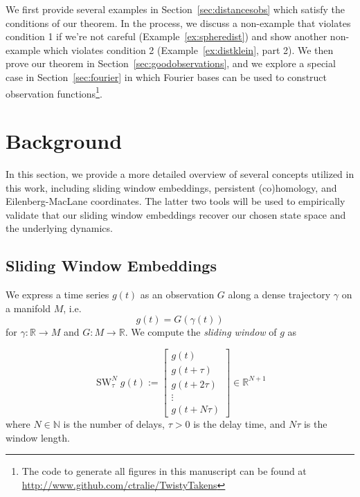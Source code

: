 \documentclass[11pt]{article}
\newcommand{\ChrisEdit}[1]{\textcolor{red}{(#1)}}
\theoremstyle{definition}
\theoremstyle{remark}
\newcommand{\RR}{\mathbb{R}}
\newcommand{\NN}{\mathbb{N}}
\DeclareMathOperator{\SW}{SW}
\begin{document}
    
    We first provide several examples in Section~\ref{sec:distancesobs} which satisfy the conditions of our theorem.  In the process, we discuss a non-example that violates condition 1 if we're not careful (Example~\ref{ex:spheredist}) and show another non-example which violates condition 2 (Example~\ref{ex:distklein}, part 2).  We then prove our theorem in Section~\ref{sec:goodobservations}, and we explore a special case in Section~\ref{sec:fourier} in which Fourier bases can be used to construct observation functions\footnote{The code to generate all figures in this manuscript can be found at \url{http://www.github.com/ctralie/TwistyTakens}}.



    \section{Background}


    In this section, we provide a more detailed overview of several  concepts utilized in this work, including sliding window embeddings, persistent (co)homology, and Eilenberg-MacLane coordinates.  The latter two tools will be used to empirically validate that our sliding window embeddings recover our chosen state space
     and the underlying dynamics.




    \subsection{Sliding Window Embeddings}

    We express a time series $g(t)$ as an observation $G$ along a dense trajectory $\gamma$ on a manifold $M$, i.e.
    \[g(t) = G(\gamma(t))\]
    for $\gamma : \RR \longrightarrow M$ and $G: M \longrightarrow \RR$.
    We compute the \emph{sliding window} of $g$ as

    \begin{equation}
    \label{eq:slidingwindow}
    \SW^N_\tau g(t) := \left[ \begin{array}{c} g(t) \\ g(t + \tau) \\ g(t + 2 \tau) \\ \vdots \\ g(t + N\tau) \end{array} \right] \in \mathbb{R}^{N+1}
    \end{equation}
    where $N\in \NN$ is the number of delays, $\tau > 0$ is the delay time, and $N \tau$ is the window length.
\end{document}
